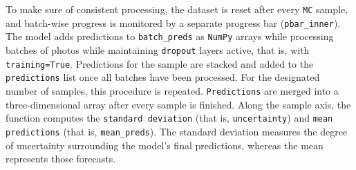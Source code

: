 \documentclass[12pt,onecolumn]{report}
\begin{document}
To make sure of consistent processing, the dataset is reset after every \texttt{MC} sample, and batch-wise progress is monitored by a separate progress bar (\texttt{pbar\_inner}). The model adds predictions to \texttt{batch\_preds} as \texttt{NumPy} arrays while processing batches of photos while maintaining \texttt{dropout} layers active, that is, with \texttt{training=True}. Predictions for the sample are stacked and added to the \texttt{predictions} list once all batches have been processed. For the designated number of samples, this procedure is repeated. \texttt{Predictions} are merged into a three-dimensional array after every sample is finished. Along the sample axis, the function computes the \texttt{standard deviation} (that is, \texttt{uncertainty}) and \texttt{mean predictions} (that is, \texttt{mean\_preds}). The standard deviation measures the degree of uncertainty surrounding the model's final predictions, whereas the mean represents those forecasts.
\end{document}
